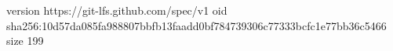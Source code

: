 version https://git-lfs.github.com/spec/v1
oid sha256:10d57da085fa988807bbfb13faadd0bf784739306c77333bcfc1e77bb36c5466
size 199
